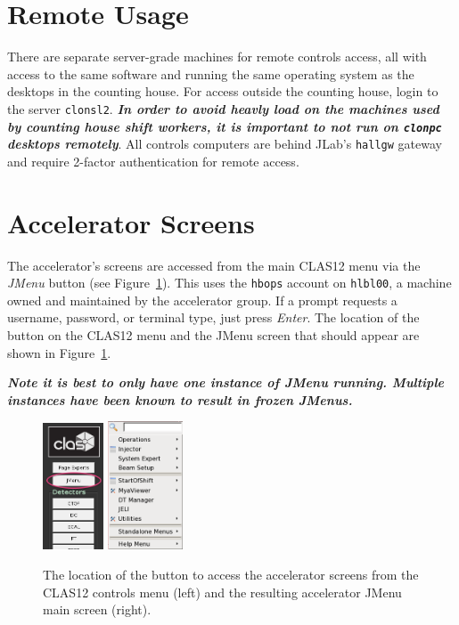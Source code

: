 \documentclass[amsmath,amssymb,notitlepage,11pt]{revtex4}
\begin{document}
\section{Remote Usage}\label{sec:remote}
There are separate server-grade machines for remote controls access, all with access to the same software and running the same operating system as the desktops in the counting house.  For access outside the counting house, login to the server \texttt{clonsl2}.  {\bf\em In order to avoid heavly load on the machines used by counting house shift workers, it is important to not run on \texttt{clonpc} desktops remotely}.  All controls computers are behind JLab's \texttt{hallgw} gateway and require 2-factor authentication for remote access.  

\newpage
\section{Accelerator Screens}
The accelerator's screens are accessed from the main CLAS12 menu via the {\em JMenu} button (see Figure~\ref{fig:jmenu}).  This uses the \texttt{hbops} account on \texttt{hlbl00}, a machine owned and maintained by the accelerator group.  If a prompt requests a username, password, or terminal type, just press {\em Enter}.  The location of the button on the CLAS12 menu and the JMenu screen that should appear are shown in Figure~\ref{fig:jmenu}.

{\bf\em Note it is best to only have one instance of JMenu running.  Multiple instances have been known to result in frozen JMenus.}
\begin{figure}[htbp]\centering
  \includegraphics[width=0.16\textwidth]{pics/clas12jmenu}
  \includegraphics[width=0.2\textwidth]{pics/jmenu}
  \caption{The location of the button to access the accelerator screens from the CLAS12 controls menu (left) and the resulting accelerator JMenu main screen (right).\label{fig:jmenu}}
\end{figure}
\end{document}
